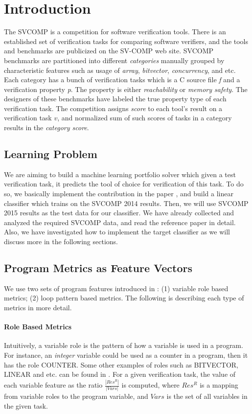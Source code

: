 \section{Introduction}
\label{intro}
The SVCOMP is a competition for software verification tools. There is an established set of verification tasks for comparing software verifiers, and the tools and benchmarks are publicized on the SV-COMP web site. SVCOMP benchmarks are partitioned into different \emph{categories} manually grouped by characteristic features such as usage of \emph{array}, \emph{bitvector}, \emph{concurrency}, and etc. Each category has a bunch of verification tasks which is a C source file \emph{f} and a verification property \emph{p}. The property is either \emph{reachability} or \emph{memory safety}. The designers of these benchmarks have labeled the true property type of each verification task. The competition assigns \emph{score} to each tool's result on a verification task $v$, and normalized sum of such scores of tasks in a category results in the \emph{category score}.

\subsection{Learning Problem}
We are aiming to build a machine learning portfolio solver which given a test verification task, it predicts the tool of choice for verification of this task. To do so, we basically implement the contribution in the paper \cite{DPVF:tool}, and build a linear classifier which trains on the SVCOMP 2014 results. Then, we will use SVCOMP 2015 results as the test data for our classifier. We have already collected and analyzed the required SVCOMP data, and read the reference paper \cite{DPVF:tool} in detail. Also, we have investigated how to implement the target classifier as we will discuss more in the following sections.

\subsection{Program Metrics as Feature Vectors}
We use two sets of program features introduced in \cite{DPVF:tool}: (1) variable role based metrics; (2) loop pattern based metrics. The following is describing each type of metrics in more detail.
\paragraph{Role Based Metrics}
Intuitively, a variable role is the pattern of how a variable is used in a program. For instance, an \emph{integer} variable could be used as a counter in a program, then it has the role COUNTER. Some other examples of roles such as BITVECTOR, LINEAR and etc. can be found in \cite{DPVF:tool, DVZ:var:role}. For a given verification task, the value of each variable feature as the ratio $\frac{|Res^R|}{|Vars|}$ is computed, where $Res^R$ is a mapping from variable roles to the program variable, and $Vars$ is the set of all variables in the given task.
